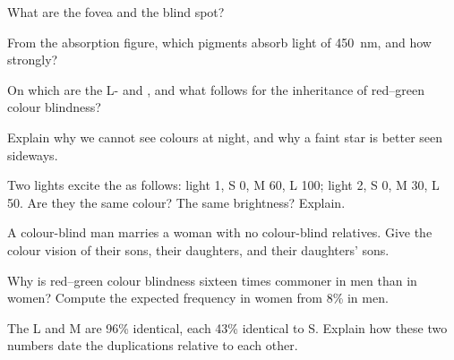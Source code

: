 \begin{exercise}[$\star$]\label{exo:g11:the-eye:3}
What are the fovea and the blind spot?
\end{exercise}

\begin{exercise}[$\star$]\label{exo:g11:the-eye:4}
From the absorption figure, which pigments absorb light of
\qty{450}{nm}, and how strongly?
\end{exercise}

\begin{exercise}[$\star$]\label{exo:g11:the-eye:5}
On which  are the L- and  , and what follows for
the inheritance of red--green colour blindness?
\end{exercise}

\begin{exercise}[$\star\star$]\label{exo:g11:the-eye:6}
Explain why we cannot see colours at night, and why a faint star is
better seen sideways.
\end{exercise}

\begin{exercise}[$\star\star$]\label{exo:g11:the-eye:7}
Two lights excite the  as follows: light 1, S 0, M 60, L 100;
light 2, S 0, M 30, L 50. Are they the same colour? The same
brightness? Explain.
\end{exercise}

\begin{exercise}[$\star\star$]\label{exo:g11:the-eye:8}
A colour-blind man marries a woman with no colour-blind relatives.
Give the colour vision of their sons, their daughters, and their
daughters' sons.
\end{exercise}

\begin{exercise}[$\star\star$]\label{exo:g11:the-eye:9}
Why is red--green colour blindness sixteen times commoner in men than
in women? Compute the expected frequency in women from 8\% in men.
\end{exercise}

\begin{exercise}[$\star\star$]\label{exo:g11:the-eye:10}
The L and M  are 96\% identical, each 43\% identical to S.
Explain how these two numbers date the duplications relative to each
other.
\end{exercise}


